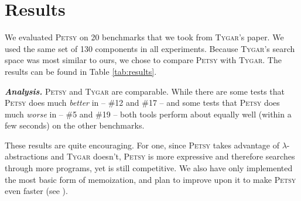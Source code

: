 \documentclass[acmsmall,nonacm]{acmart}
\begin{document}

\section{Results}



We evaluated \textsc{Petsy} on 20 benchmarks that we took from \textsc{Tygar}'s \cite{tygar} paper. 
We used the same set of 130 components in all experiments. Because \textsc{Tygar}'s search 
space was most similar to ours, we chose to compare \textsc{Petsy} with \textsc{Tygar}.
The results can be found in Table \ref{tab:results}.



\vspace{2mm}
\noindent \textbf{\textit{Analysis.}} 
\textsc{Petsy} and \textsc{Tygar} are comparable.
While there are some tests that \textsc{Petsy} does much \textit{better} in -- \#12 and \#17 --
and some tests that \textsc{Petsy} does much \textit{worse} in -- \#5 and \#19 -- both tools perform
about equally well (within a few seconds) on the other benchmarks.

These results are quite encouraging. For one, since \textsc{Petsy} takes advantage of 
$\lambda$-abstractions and \textsc{Tygar} doesn't, \textsc{Petsy} is more expressive and therefore searches through 
more programs, yet is still competitive. We also have only implemented the most
basic form of memoization, and plan to improve upon it to make \textsc{Petsy} even
faster (see ).
\end{document}
